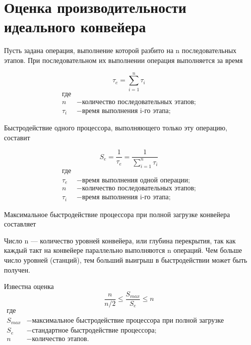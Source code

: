 \documentclass[12pt]{report}
\begin{document}
\section{Оценка производительности идеального конвейера}

Пусть задана операция, выполнение которой разбито на n последовательных этапов. При последовательном их выполнении операция выполняется за время

\begin{equation}\label{form:way} 
 \tau _{e}={\sum\limits_{i=1}^n \tau _{i}}
 \end{equation}
 \begin{align*}
    \text{где} \\
    n &- \text{количество последовательных этапов;} \\
   \tau _{i} &- \text{время выполнения i-го этапа;}
\end{align*}

Быстродействие одного процессора, выполняющего только эту операцию, составит

\begin{equation}\label{form:way} 
 S_{e}={\frac{1}{\tau _{e}}}={\frac{1}{\sum\limits_{i=1}^n \tau _{i}}}
 \end{equation}
 \begin{align*}
    \text{где} \\
    \tau _{e} &- \text{время выполнения одной операции;} \\
    n &- \text{количество последовательных этапов;} \\
   \tau _{i} &- \text{время выполнения i-го этапа;}
\end{align*}


Максимальное быстродействие процессора при полной загрузке конвейера составляет



Число n — количество уровней конвейера, или глубина перекрытия, так как каждый такт на конвейере параллельно выполняются n операций. Чем больше число уровней (станций), тем больший выигрыш в быстродействии может быть получен.

Известна оценка
\begin{equation}\label{form:way} 
{\frac{n}{n/2} \leq {\frac{S_{max}}{S_{e}}} \leq n}
 \end{equation}
 \begin{align*}
    \text{где} \\
    S_{max} &- \text{максимальное быстродействие процессора  при полной загрузке конвейера;} \\
    S_{e} &- \text{стандартное быстродействие процессора;} \\
   n &- \text{количество этапов.}
\end{align*}
\end{document}
